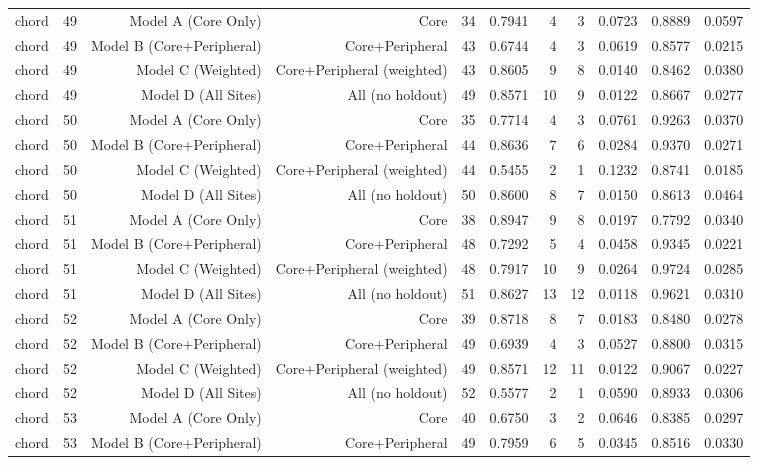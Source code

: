 {\begin{longtable}{lrrrrrrrrrr}
  chord & 49 & Model A (Core Only) & Core & 34 & 0.7941 & 4 & 3 & 0.0723 & 0.8889 & 0.0597 \\
  chord & 49 & Model B (Core+Peripheral) & Core+Peripheral & 43 & 0.6744 & 4 & 3 & 0.0619 & 0.8577 & 0.0215 \\
  chord & 49 & Model C (Weighted) & Core+Peripheral (weighted) & 43 & 0.8605 & 9 & 8 & 0.0140 & 0.8462 & 0.0380 \\
  chord & 49 & Model D (All Sites) & All (no holdout) & 49 & 0.8571 & 10 & 9 & 0.0122 & 0.8667 & 0.0277 \\
  chord & 50 & Model A (Core Only) & Core & 35 & 0.7714 & 4 & 3 & 0.0761 & 0.9263 & 0.0370 \\
  chord & 50 & Model B (Core+Peripheral) & Core+Peripheral & 44 & 0.8636 & 7 & 6 & 0.0284 & 0.9370 & 0.0271 \\
  chord & 50 & Model C (Weighted) & Core+Peripheral (weighted) & 44 & 0.5455 & 2 & 1 & 0.1232 & 0.8741 & 0.0185 \\
  chord & 50 & Model D (All Sites) & All (no holdout) & 50 & 0.8600 & 8 & 7 & 0.0150 & 0.8613 & 0.0464 \\
  chord & 51 & Model A (Core Only) & Core & 38 & 0.8947 & 9 & 8 & 0.0197 & 0.7792 & 0.0340 \\
  chord & 51 & Model B (Core+Peripheral) & Core+Peripheral & 48 & 0.7292 & 5 & 4 & 0.0458 & 0.9345 & 0.0221 \\
  chord & 51 & Model C (Weighted) & Core+Peripheral (weighted) & 48 & 0.7917 & 10 & 9 & 0.0264 & 0.9724 & 0.0285 \\
  chord & 51 & Model D (All Sites) & All (no holdout) & 51 & 0.8627 & 13 & 12 & 0.0118 & 0.9621 & 0.0310 \\
  chord & 52 & Model A (Core Only) & Core & 39 & 0.8718 & 8 & 7 & 0.0183 & 0.8480 & 0.0278 \\
  chord & 52 & Model B (Core+Peripheral) & Core+Peripheral & 49 & 0.6939 & 4 & 3 & 0.0527 & 0.8800 & 0.0315 \\
  chord & 52 & Model C (Weighted) & Core+Peripheral (weighted) & 49 & 0.8571 & 12 & 11 & 0.0122 & 0.9067 & 0.0227 \\
  chord & 52 & Model D (All Sites) & All (no holdout) & 52 & 0.5577 & 2 & 1 & 0.0590 & 0.8933 & 0.0306 \\
  chord & 53 & Model A (Core Only) & Core & 40 & 0.6750 & 3 & 2 & 0.0646 & 0.8385 & 0.0297 \\
  chord & 53 & Model B (Core+Peripheral) & Core+Peripheral & 49 & 0.7959 & 6 & 5 & 0.0345 & 0.8516 & 0.0330 \\

\end{longtable}}
